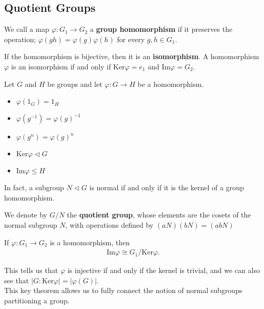 \documentclass{memoir}
\begin{document}
\subsection{Quotient Groups}
\label{subsec:quotient_groups}


\begin{defn}
	We call a map \(\varphi:G_1\to G_2\) a \textbf{group homomorphism} if it preserves the operation; \(\varphi(gh) = \varphi(g)\varphi(h)\) for every \(g,h \in G_1\).
\end{defn}
If the homomorphism is bijective, then it is an \textbf{isomorphism}. A homomorphism \(\varphi\) is an isomorphism if and only if \( \textrm{Ker}\varphi = e_1\) and \( \textrm{Im}\varphi = G_2\).

\begin{prop}
	Let \(G\) and \(H\) be groups and let \(\varphi :G\to H\) be a homomorphism.
	\begin{itemize}
		\item \(\varphi (1_G) = 1_H\) 
		\item \(\varphi (g^{-1}) = \varphi (g)^{-1}\)
		\item \(\varphi (g^{n}) = \varphi (g)^{n}\) 
		\item \(\textrm{Ker}\varphi \triangleleft G\)
		\item \(\textrm{Im}\varphi \leq H\)
	\end{itemize}
\end{prop}
In fact, a subgroup \(N \triangleleft G\) is normal if and only if it is the kernel of a group homomorphism.

\begin{defn}
	We denote by \(G / N\) the \textbf{quotient group}, whose elements are the cosets of the normal subgroup \(N\), with operations defined by \((aN)(bN) = (abN)\)
\end{defn}
\begin{thm}
If \(\varphi:G_1\to G_2\) is a homomorphism, then
\begin{align*}
	\textrm{Im}\varphi \cong G_1 / \textrm{Ker}\varphi.
\end{align*}
\end{thm}
This tells us that \(\varphi \) is injective if and only if the kernel is trivial, and we can also see that \(\left| G : \textrm{Ker}\varphi  \right|  = \left| \varphi (G) \right| \).\\

This key theorem allows us to fully connect the notion of normal subgroups partitioning a group.
\end{document}
